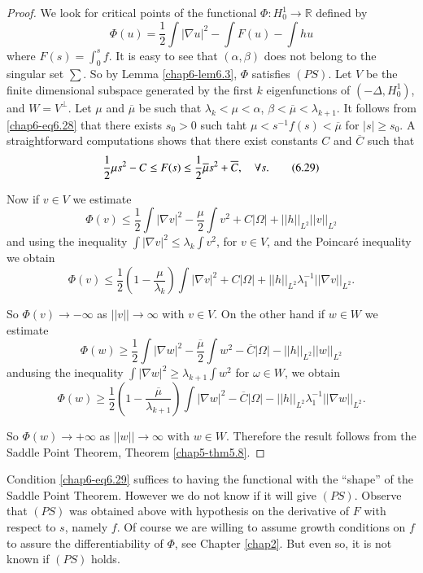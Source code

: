 \begin{proof}
We look for critical points of the functional $\Phi:H^{1}_{0}\to
\mathbb{R}$ defined by
$$
\Phi(u)=\frac{1}{2}\int |\nabla u|^{2}-\int F(u)-\int hu
$$
where $F(s)=\int^{s}_{0}f$. It is easy to see that $(\alpha,\beta)$
does not belong to the singular set $\sum$. So by Lemma
\ref{chap6-lem6.3}, $\Phi$ satisfies $(PS)$. Let $V$ be the finite
dimensional subspace generated by the first $k$ eigenfunctions of
$(-\Delta,H^{1}_{0})$, and $W=V^{\perp}$. Let $\mu$ and
$\overline{\mu}$ be such that $\lambda_{k}<\mu<\alpha$,
$\beta<\overline{\mu}<\lambda_{k+1}$. It follows from
\eqref{chap6-eq6.28} that there exists $s_{0}>0$ such taht
$\mu<s^{-1}f(s)<\overline{\mu}$ for $|s|\geq s_{0}$. A straightforward
computations shows that there exist constants $C$ and $\overline{C}$
such that
\begin{equation*}
\frac{1}{2}\mu s^{2}-C\leq F(s)\leq
\frac{1}{2}\overline{\mu}s^{2}+\overline{C},\quad \forall
s.\tag{6.29}\label{chap6-eq6.29} 
\end{equation*}

Now if $v\in V$ we estimate
$$
\Phi(v)\leq \frac{1}{2}\int |\nabla v|^{2}-\frac{\mu}{2}\int
v^{2}+C|\Omega|+||h||_{L^{2}}||v||_{L^{2}} 
$$
and using the inequality $\int|\nabla v|^{2}\leq \lambda_{k}\int
v^{2}$, for $v\in V$, and the Poincar\'e inequality we obtain
$$
\Phi(v)\leq \frac{1}{2}\left(1-\frac{\mu}{\lambda_{k}}\right)\int
|\nabla v|^{2}+C|\Omega|+||h||_{L^{2}}\lambda^{-1}_{1}||\nabla
v||_{L^{2}}. 
$$

So $\Phi(v)\to -\infty$ as $||v||\to \infty$ with $v\in V$. On the
other hand if $w\in W$ we estimate
$$
\Phi(w)\geq \frac{1}{2}\int |\nabla
w|^{2}-\frac{\overline{\mu}}{2}\int
w^{2}-\overline{C}|\Omega|-||h||_{L^{2}}||w||_{L^{2}} 
$$
and\pageoriginale using the inequality $\int|\nabla w|^{2}\geq
\lambda_{k+1}\int w^{2}$ for $\omega\in W$, we obtain
$$
\Phi(w)\geq
\frac{1}{2}\left(1-\frac{\overline{\mu}}{\lambda_{k+1}}\right)\int
|\nabla
w|^{2}-\overline{C}|\Omega|-||h||_{L^{2}}\lambda^{-1}_{1}||\nabla
w||_{L^{2}}. 
$$

So $\Phi(w)\to +\infty$ as $||w||\to \infty$ with $w\in W$. Therefore
the result follows from the Saddle Point Theorem, Theorem
\ref{chap5-thm5.8}. 
\end{proof}

\begin{remark*}
Condition \eqref{chap6-eq6.29} suffices to having the functional with
the ``shape'' of the Saddle Point Theorem. However we do not know if
it will give $(PS)$. Observe that $(PS)$ was obtained above with
hypothesis on the derivative of $F$ with respect to $s$, namely
$f$. Of course we are willing to assume growth conditions on $f$ to
assure the differentiability of $\Phi$, see Chapter \ref{chap2}. But
even so, it is not known if $(PS)$ holds. 
\end{remark*}

